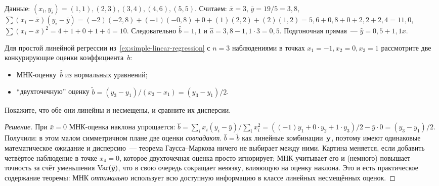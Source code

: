 \begin{example}
\label{ex:numerical-fit}
Данные: $(x_i, y_i) = (1, 1), (2, 3), (3, 4), (4, 6), (5, 5)$. Считаем: $\bar x = 3$, $\bar y = 19/5 = 3{,}8$, $\sum (x_i - \bar x)(y_i - \bar y) = (-2)(-2{,}8) + (-1)(-0{,}8) + 0 + (1)(2{,}2) + (2)(1{,}2) = 5{,}6 + 0{,}8 + 0 + 2{,}2 + 2{,}4 = 11{,}0$, $\sum (x_i - \bar x)^2 = 4 + 1 + 0 + 1 + 4 = 10$. Следовательно $\hat b = 1{,}1$ и $\hat a = 3{,}8 - 1{,}1 \cdot 3 = 0{,}5$. Подгоночная прямая~--- $\hat y = 0{,}5 + 1{,}1 x$.
\end{example}

\begin{problem}
\label{prob:gauss-markov-comparison}
Для простой линейной регрессии из~\cref{ex:simple-linear-regression} с $n = 3$ наблюдениями в точках $x_1 = -1, x_2 = 0, x_3 = 1$ рассмотрите две конкурирующие оценки коэффициента~$b$:
\begin{itemize}
  \item МНК-оценку~$\hat b$ из нормальных уравнений;
  \item ``двухточечную'' оценку $\tilde b = (y_3 - y_1)/(x_3 - x_1) = (y_3 - y_1)/2$.
\end{itemize}
Покажите, что обе они линейны и несмещены, и сравните их дисперсии.
\end{problem}

\begin{proof}[Решение]
При $\bar x = 0$ МНК-оценка наклона упрощается: $\hat b = \sum_i x_i (y_i - \bar y)/\sum_i x_i^2 = ((-1) y_1 + 0 \cdot y_2 + 1 \cdot y_3)/2 - \bar y \cdot 0 = (y_3 - y_1)/2$. Получили: в этом малом симметричном плане две оценки \emph{совпадают}. $\hat b = \tilde b$ как линейные комбинации~$\mathbf{y}$, поэтому имеют одинаковые математическое ожидание и дисперсию~--- теорема Гаусса--Маркова ничего не выбирает между ними. Картина меняется, если добавить четвёртое наблюдение в точке $x_4 = 0$, которое двухточечная оценка просто игнорирует; МНК учитывает его и (немного) повышает точность за счёт уменьшения $\operatorname{Var}(\bar y)$, что в свою очередь сокращает невязку, влияющую на оценку наклона. Это и есть практическое содержание теоремы: МНК \emph{оптимально} использует всю доступную информацию в классе линейных несмещённых оценок.
\end{proof}

